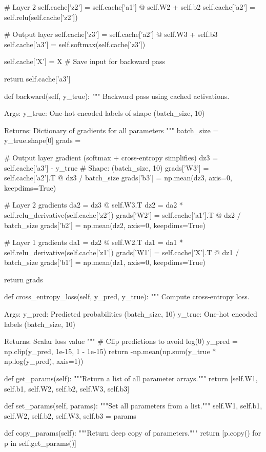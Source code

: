 \documentclass[../../main.tex]{subfiles}
\begin{document}
\begin{pythoncode}
        # Layer 2
        self.cache['z2'] = self.cache['a1'] @ self.W2 + self.b2
        self.cache['a2'] = self.relu(self.cache['z2'])

        # Output layer
        self.cache['z3'] = self.cache['a2'] @ self.W3 + self.b3
        self.cache['a3'] = self.softmax(self.cache['z3'])

        self.cache['X'] = X  # Save input for backward pass

        return self.cache['a3']

    def backward(self, y_true):
        """
        Backward pass using cached activations.

        Args:
            y_true: One-hot encoded labels of shape (batch_size, 10)

        Returns:
            Dictionary of gradients for all parameters
        """
        batch_size = y_true.shape[0]
        grads = {}

        # Output layer gradient (softmax + cross-entropy simplifies)
        dz3 = self.cache['a3'] - y_true  # Shape: (batch_size, 10)
        grads['W3'] = self.cache['a2'].T @ dz3 / batch_size
        grads['b3'] = np.mean(dz3, axis=0, keepdims=True)

        # Layer 2 gradients
        da2 = dz3 @ self.W3.T
        dz2 = da2 * self.relu_derivative(self.cache['z2'])
        grads['W2'] = self.cache['a1'].T @ dz2 / batch_size
        grads['b2'] = np.mean(dz2, axis=0, keepdims=True)

        # Layer 1 gradients
        da1 = dz2 @ self.W2.T
        dz1 = da1 * self.relu_derivative(self.cache['z1'])
        grads['W1'] = self.cache['X'].T @ dz1 / batch_size
        grads['b1'] = np.mean(dz1, axis=0, keepdims=True)

        return grads

    def cross_entropy_loss(self, y_pred, y_true):
        """
        Compute cross-entropy loss.

        Args:
            y_pred: Predicted probabilities (batch_size, 10)
            y_true: One-hot encoded labels (batch_size, 10)

        Returns:
            Scalar loss value
        """
        # Clip predictions to avoid log(0)
        y_pred = np.clip(y_pred, 1e-15, 1 - 1e-15)
        return -np.mean(np.sum(y_true * np.log(y_pred), axis=1))

    def get_params(self):
        """Return a list of all parameter arrays."""
        return [self.W1, self.b1, self.W2, self.b2, self.W3, self.b3]

    def set_params(self, params):
        """Set all parameters from a list."""
        self.W1, self.b1, self.W2, self.b2, self.W3, self.b3 = params

    def copy_params(self):
        """Return deep copy of parameters."""
        return [p.copy() for p in self.get_params()]
\end{pythoncode}
\end{document}
